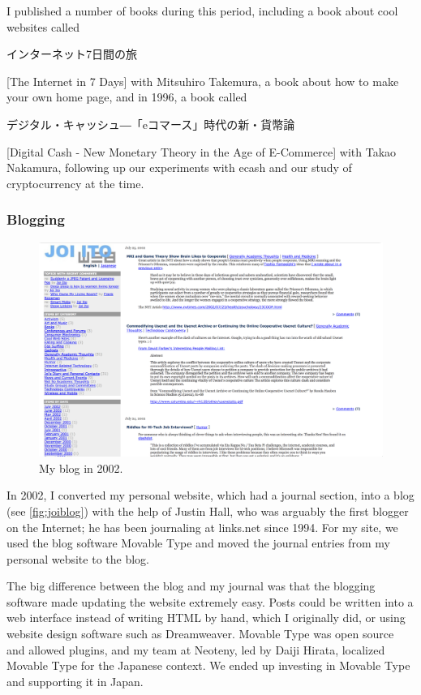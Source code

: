 I published a number of books during this period, including a book about cool websites called \begin{CJK}{UTF8}{min}インターネット7日間の旅\end{CJK} [The Internet in 7 Days] \cite{takemuraito} with Mitsuhiro Takemura, a book about how to make your own home page, and in 1996, a book called \begin{CJK}{UTF8}{min}デジタル・キャッシュ―「eコマース」時代の新・貨幣論\end{CJK} [Digital Cash - New Monetary Theory in the Age of E-Commerce] \cite{digitalcash} with Takao Nakamura, following up our experiments with ecash and our study of cryptocurrency at the time.

\subsubsection{Blogging}
\label{sec:blogging}

\begin{figure}[h]
 \centering
 \includegraphics[width=1\textwidth]{pictures/joiblog}
 \caption{My blog in 2002.}
 \label{fig:joiblog}
\end{figure}

In 2002, I converted my personal website, which had a journal section, into a blog (see \autoref{fig:joiblog}) with the help of Justin Hall, who was arguably the first blogger on the Internet; he has been journaling at links.net since 1994. For my site, we used the blog software Movable Type and moved the journal entries from my personal website to the blog.

The big difference between the blog and my journal was that the blogging software made updating the website extremely easy. Posts could be written into a web interface instead of writing \ac{HTML} by hand, which I originally did, or using website design software such as Dreamweaver. Movable Type was open source and allowed plugins, and my team at Neoteny, led by Daiji Hirata, localized Movable Type for the Japanese context. We ended up investing in Movable Type and supporting it in Japan.

